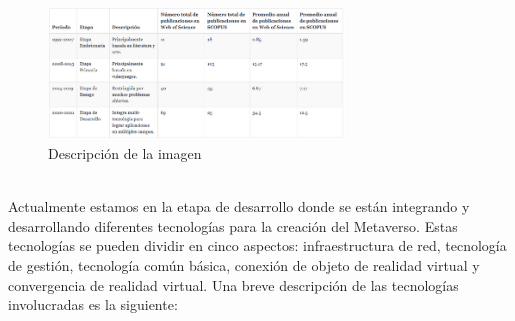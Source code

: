 \documentclass[a4paper,10pt]{article}
\begin{document}
	\begin{figure}[h]
		\centering
		\includegraphics[width=0.7\textwidth]{tablaPublicaciones.PNG}
		\caption{Descripción de la imagen}
		\label{fig:tabla_publicaciones}
	\end{figure} \\
	Actualmente estamos en la etapa de desarrollo donde se están integrando y desarrollando diferentes tecnologías para la creación del Metaverso.  Estas tecnologías se pueden dividir en cinco aspectos: infraestructura de red, tecnología de gestión, tecnología común básica, conexión de objeto de realidad virtual y convergencia de realidad virtual. Una breve descripción de las tecnologías involucradas es la siguiente:
\end{document}
